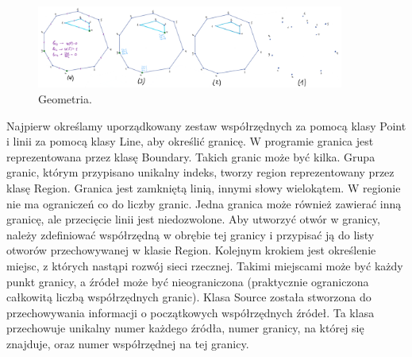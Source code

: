 \documentclass[]{pracamgr}
\begin{document}
      \begin{figure}[H]
        \centering
        \includegraphics[width=0.9\textwidth]{figs/region_workflow.png}
        \caption {Geometria.}
        \label{region_workflow}
      \end{figure}

      Najpierw określamy uporządkowany zestaw współrzędnych za pomocą klasy Point i linii za pomocą klasy Line, aby określić granicę. W programie granica jest reprezentowana przez klasę Boundary. Takich granic może być kilka. Grupa granic, którym przypisano unikalny indeks, tworzy region reprezentowany przez klasę Region. Granica jest zamkniętą linią, innymi słowy wielokątem. W regionie nie ma ograniczeń co do liczby granic. Jedna granica może również zawierać inną granicę, ale przecięcie linii jest niedozwolone. Aby utworzyć otwór w granicy, należy zdefiniować współrzędną w obrębie tej granicy i przypisać ją do listy otworów przechowywanej w klasie Region. Kolejnym krokiem jest określenie miejsc, z których nastąpi rozwój sieci rzecznej. Takimi miejscami może być każdy punkt granicy, a źródeł może być nieograniczona (praktycznie ograniczona całkowitą liczbą współrzędnych granic). Klasa Source została stworzona do przechowywania informacji o początkowych współrzędnych źródeł. Ta klasa przechowuje unikalny numer każdego źródła, numer granicy, na której się znajduje, oraz numer współrzędnej na tej granicy.
\end{document}
